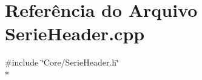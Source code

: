 \section{Referência do Arquivo Serie\+Header.\+cpp}
\label{_serie_header_8cpp}
{\ttfamily \#include \char`\"{}Core/\+Serie\+Header.\+h\char`\"{}}\\*

